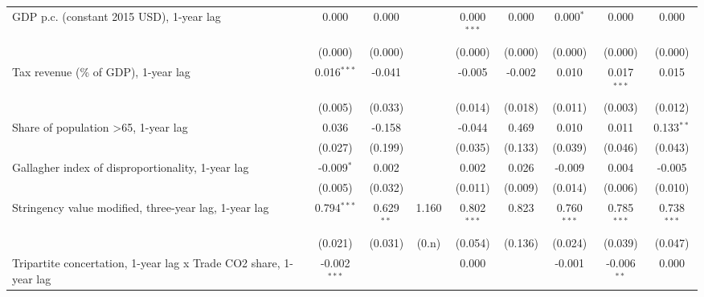 \begin{table}[htbp]
\begin{tabular}{lcccccccc}
      GDP p.c. (constant 2015 USD), 1-year lag                          & 0.000          & 0.000                     &              & 0.000$^{***}$  & 0.000            & 0.000$^{*}$     & 0.000           & 0.000\\   
                                                                        & (0.000)        & (0.000)                   &              & (0.000)        & (0.000)          & (0.000)         & (0.000)         & (0.000)\\   
      Tax revenue (\% of GDP), 1-year lag                               & 0.016$^{***}$  & -0.041                    &              & -0.005         & -0.002           & 0.010           & 0.017$^{***}$   & 0.015\\   
                                                                        & (0.005)        & (0.033)                   &              & (0.014)        & (0.018)          & (0.011)         & (0.003)         & (0.012)\\   
      Share of population >65, 1-year lag                               & 0.036          & -0.158                    &              & -0.044         & 0.469            & 0.010           & 0.011           & 0.133$^{**}$\\   
                                                                        & (0.027)        & (0.199)                   &              & (0.035)        & (0.133)          & (0.039)         & (0.046)         & (0.043)\\   
      Gallagher index of disproportionality, 1-year lag                 & -0.009$^{*}$   & 0.002                     &              & 0.002          & 0.026            & -0.009          & 0.004           & -0.005\\   
                                                                        & (0.005)        & (0.032)                   &              & (0.011)        & (0.009)          & (0.014)         & (0.006)         & (0.010)\\   
      Stringency value modified, three-year lag, 1-year lag             & 0.794$^{***}$  & 0.629$^{**}$              & 1.160        & 0.802$^{***}$  & 0.823            & 0.760$^{***}$   & 0.785$^{***}$   & 0.738$^{***}$\\   
                                                                        & (0.021)        & (0.031)                   & (0.n)        & (0.054)        & (0.136)          & (0.024)         & (0.039)         & (0.047)\\   
      Tripartite concertation, 1-year lag x Trade CO2 share, 1-year lag & -0.002$^{***}$ &                           &              & 0.000          &                  & -0.001          & -0.006$^{**}$   & 0.000\\   

\end{tabular}
\end{table}
